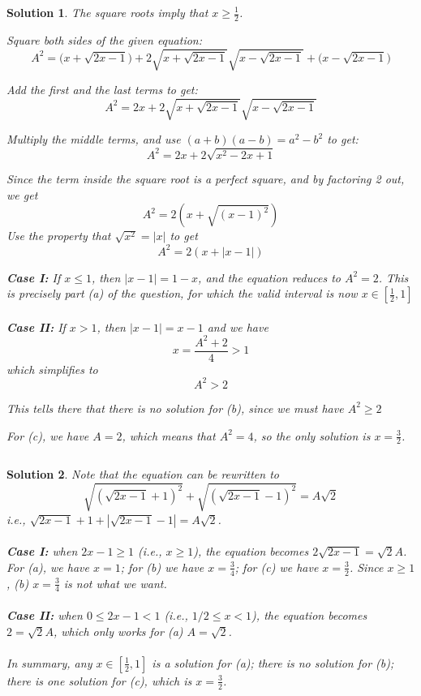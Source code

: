 \documentclass[12pt]{article}
\newtheorem*{solution*}{Solution}
\begin{document}
\begin{solution*}
The square roots imply that $x\ge \frac{1}{2}$.

Square both sides of the given equation: $$A^2 = \Big( x + \sqrt{2x - 1}\Big) + 2 \sqrt{x + \sqrt{2x - 1}}  \sqrt{x - \sqrt{2x - 1}} +  \Big( x - \sqrt{2x - 1}\Big) $$

Add the first and the last terms to get:
$$A^2 = 2x + 2 \sqrt{x + \sqrt{2x - 1}}  \sqrt{x - \sqrt{2x - 1}}$$

Multiply the middle terms, and use $(a + b)(a - b) = a^2 - b^2$ to get:
$$A^2 = 2x + 2 \sqrt{x^2 - 2x + 1}$$

Since the term inside the square root is a perfect square, and by factoring 2 out, we get
$$A^2 = 2(x + \sqrt{(x-1)^2})$$
Use the property that $\sqrt{x^2}=|x|$ to get
$$A^2 = 2(x+|x-1|)$$

\textbf{Case I:} If $x \le 1$, then $|x-1| = 1 - x$, and the equation reduces to $A^2 = 2$. This is precisely part (a) of the question, for which the valid interval is now $x \in \left[ \frac{1}{2}, 1 \right]$
\\ \\
\textbf{Case II:} If $x > 1$, then $|x-1| = x - 1$ and we have
$$x = \frac{A^2 + 2}{4} > 1$$
which simplifies to 
$$A^2 > 2 $$

This tells there that there is no solution for (b), since we must have $A^2 \ge 2$

For (c), we have $A = 2$, which means that $A^2 = 4$, so the only solution is $ x=\frac{3}{2}$.
\end{solution*}
$$$$
\begin{solution*}
Note that the equation can be rewritten to 
$$\sqrt{(\sqrt{2x-1}+1)^2} + \sqrt{(\sqrt{2x-1}-1)^2}=A\sqrt{2}$$
i.e., $\sqrt{2x-1}+1 + |\sqrt{2x-1}-1|=A\sqrt{2}$. 
\\ \\
\textbf{Case I:} when $2x-1\ge 1$ (i.e., $x\ge 1$), the equation becomes $2\sqrt{2x-1}=\sqrt{2}A$. For (a), we have $x=1$; for (b) we have $x=\frac{3}{4}$; for (c) we have $x=\frac{3}{2}$. Since $x\ge 1$, (b) $x=\frac{3}{4}$ is not what we want.
\\ \\
\textbf{Case II:} when $0\le 2x-1 <1$ (i.e., $1/2\le x <1$), the equation becomes $2=\sqrt{2}A$, which only works for (a) $A=\sqrt{2}$. 
\\ \\
In summary, any $x \in \left[\frac{1}{2}, 1\right]$ is a solution for (a); there is no solution for (b); there is one solution for (c), which is $x=\frac{3}{2}$. 
\end{solution*}
\end{document}
